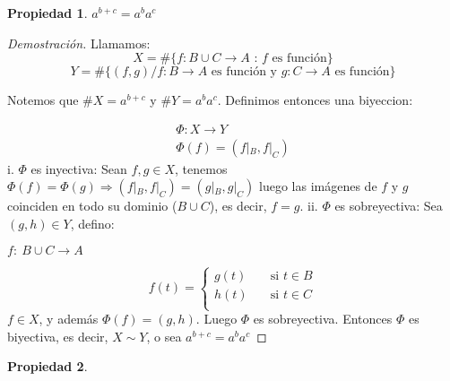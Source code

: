 \documentclass{article}
\newtheorem*{propiedad}{Propiedad}
\begin{document}
\begin{propiedad}$a^{b+c} = a^ba^c$
\end{propiedad}
\begin{proof}[Demostración]
Llamamos: 
 \[ X = \#\{ f: B \cup C \rightarrow A\text{ : $f$ es función}\} \] 
\[ Y = \#\{ (f,g) / \text{$f: B \rightarrow A$ es función y $g : C \rightarrow A$ es función}\} \]

Notemos que $\#X = a^{b+c}$ y $\#Y = a^ba^c$. Definimos entonces una biyeccion:

\begin{align*}
\Phi :  X \rightarrow Y \\
\Phi(f) = (f|_B, f|_C)
\end{align*}
\newline
i. $\Phi$ es inyectiva: Sean $f,g \in X$, tenemos $\Phi(f) = \Phi(g) \Rightarrow (f|_B, f|_C) = (g|_B, g|_C)$ luego las imágenes de $f$ y $g$ coinciden en todo su dominio ($B \cup C$), es decir, $f = g$. \newline 
\newpage ii. $\Phi$ es sobreyectiva: Sea $(g,h) \in Y$, defino:
\begin{center}$f:\ B\cup C \rightarrow A$ \end{center}
\[ f(t) =
  \begin{cases}
    g(t)       & \quad \text{si } t \in B\\
    h(t)  & \quad \text{si } t \in C\\
  \end{cases}
\]
$f \in X$, y además $\Phi(f) = (g,h)$. Luego $\Phi$ es sobreyectiva.
\newline
Entonces $\Phi$ es biyectiva, es decir, $X \sim Y$, o sea $a^{b+c} = a^ba^c$ \newline

\end{proof}
\begin{propiedad}
\end{propiedad}
\end{document}
